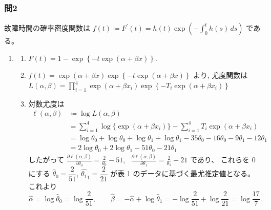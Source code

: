 \documentclass[./main.tex]{subfiles}
\begin{document}
    \subsubsection*{問2}

    故障時間の確率密度関数は $\displaystyle f(t) \coloneq F^\prime (t) = h(t) \exp \left( - \int_0^t h(s)\,ds \right)$ である。
    
    \begin{enumerate}
        \item
        \begin{enumerate}
            \item $F(t) = 1 - \exp \left\{ - t \exp (\alpha + \beta x )\right\}$.
            
            \item $f(t) = \exp (\alpha + \beta x) \exp \left\{ -t \exp(\alpha + \beta x) \right\} $ より, 尤度関数は\\
            $\displaystyle L (\alpha, \beta) = \prod_{i=1}^4
                \exp (\alpha + \beta x_i) \exp \left\{ -T_i \exp (\alpha + \beta x_i) \right\}$
            
            \item 対数尤度は
            \begin{align*}
                \ell (\alpha, \beta)
                    &\coloneq \log L (\alpha, \beta)\\
                    &= \sum_{i=1}^4 \log \{ \exp(\alpha + \beta x_i) \} - \sum_{i=1}^4 T_i \exp (\alpha + \beta x_i)\\
                    &= \log \theta_0 + \log \theta_0 + \log \theta_1 + \log \theta_1
                        - 35 \theta_0 - 16 \theta_0 - 9 \theta_1 - 12 \theta_1\\
                    &= 2 \log\theta_0 + 2\log\theta_1 - 51\theta_0 - 21\theta_1
            \end{align*}
            したがって $\displaystyle \frac{\partial \ell(\alpha, \beta)}{\partial \theta_0} = \frac{2}{\theta_0} - 51$, \ 
            $\displaystyle \frac{\partial \ell(\alpha, \beta)}{\partial \theta_1} = \frac{2}{\theta_1} - 21$ であり、
            これらを $0$ にする $\hat{\theta}_0 = \dfrac{2}{51}$, $\hat{\theta_1}_1 = \dfrac{2}{21}$ が表 1 のデータに基づく最尤推定値となる。
            これより
            \begin{equation*}
                \hat{\alpha} = \log \hat{\theta}_0 = \log \frac{2}{51}, \qquad
                \hat{\beta} = -\hat{\alpha} + \log \hat{\theta}_1
                    = - \log \frac{2}{51} + \log \frac{2}{21}
                    = \log \frac{17}{7}.
            \end{equation*}
        

\end{enumerate}
\end{enumerate}
\end{document}
